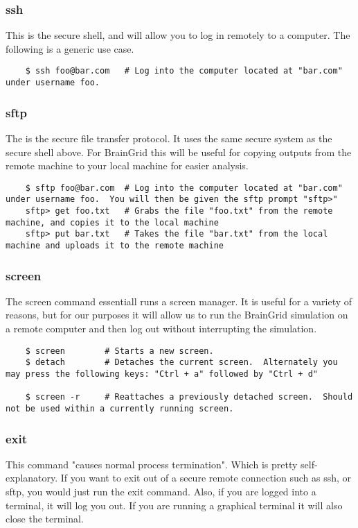 \subsubsection{ssh} \mdseries
This is the secure shell, and will allow you to log in remotely to a computer.  The following is a generic use case.

	\begin{verbatim}
	$ ssh foo@bar.com	# Log into the computer located at "bar.com" under username foo.
	\end{verbatim}
	
	
\subsubsection{sftp} \mdseries
The is the secure file transfer protocol.  It uses the same secure system as the secure shell above.  For BrainGrid this will be useful for copying outputs from the remote machine to your local machine for easier analysis.

	\begin{verbatim}
	$ sftp foo@bar.com	# Log into the computer located at "bar.com" under username foo.  You will then be given the sftp prompt "sftp>"
	sftp> get foo.txt	# Grabs the file "foo.txt" from the remote machine, and copies it to the local machine
	sftp> put bar.txt	# Takes the file "bar.txt" from the local machine and uploads it to the remote machine
	\end{verbatim}

\subsubsection{screen} \mdseries
The screen command essentiall runs a screen manager.  It is useful for a variety of reasons, but for our purposes it will allow us to run the BrainGrid simulation on a remote computer and then log out without interrupting the simulation.

	\begin{verbatim}
	$ screen		# Starts a new screen.
	$ detach		# Detaches the current screen.  Alternately you may press the following keys: "Ctrl + a" followed by "Ctrl + d"
	
	$ screen -r 	# Reattaches a previously detached screen.  Should not be used within a currently running screen.
	\end{verbatim}

\subsubsection{exit} \mdseries
This command "causes normal process termination".  Which is pretty self-explanatory.  If you want to exit out of a secure remote connection such as ssh, or sftp, you would just run the exit command.  Also, if you are logged into a terminal, it will log you out.  If you are running a graphical terminal it will also close the terminal.


